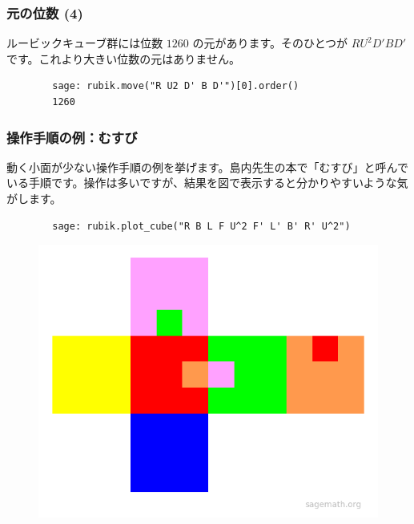 \documentclass{beamer}
\begin{document}
\begin{frame}[fragile=singleslide]
    \frametitle{元の位数 (4)}

    ルービックキューブ群には位数 \(1260\) の元があります。そのひとつが \(R U^2 D' B D'\) です。これより大きい位数の元はありません。

    \begin{verbatim}
        sage: rubik.move("R U2 D' B D'")[0].order()
        1260
    \end{verbatim}
\end{frame}

\begin{frame}[fragile=singleslide]
    \frametitle{操作手順の例：むすび}

    動く小面が少ない操作手順の例を挙げます。島内先生の本で「むすび」と呼んでいる手順です。操作は多いですが、結果を図で表示すると分かりやすいような気がします。

    \begin{verbatim}
        sage: rubik.plot_cube("R B L F U^2 F' L' B' R' U^2")
    \end{verbatim}

    \begin{figure}
        \includegraphics[scale=0.35]{images/plot_cube_musubi.png}
    \end{figure}
\end{frame}
\end{document}
